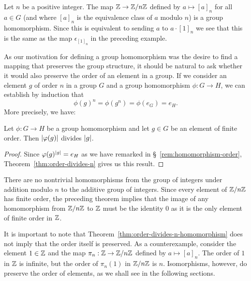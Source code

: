 \begin{example}
    Let \(n\) be a positive integer. The map \(\mathbb{Z} \to \mathbb{Z}/n\mathbb{Z}\) defined by \(a
    \mapsto [a]_n\) for all \(a \in G\) (and where \([a]_n\) is the equivalence
    class of \(a\) modulo \(n\)) is a group homomorphism. Since this is
    equivalent to sending \(a\) to \(a \cdot [1]_n\) we see that this is the
    same as the map \(\epsilon_{[1]_n}\) in the preceding example.
\end{example}

\begin{remark}
    \label{rem:homomorphism-order}
    As our motivation for defining a group homomorphism was the desire to find a
    mapping that preserves the group structure, it should be natural to ask
    whether it would also preserve the order of an element in a group. If we
    consider an element \(g\) of order \(n\) in a group \(G\) and a group
    homomorphism \(\phi: G \to H\), we can establish by induction that
    \[
        \phi(g)^n = \phi(g^n) = \phi(e_G) = e_H.
    \]
    More precisely, we have:
\end{remark}

\begin{theorem}
    \label{thm:order-divides-n-homomorphism}
    Let \(\phi: G \to H\) be a group homomorphism and let \(g \in G\) be an
    element of finite order. Then \(\lvert \varphi(g) \rvert\) divides \(\lvert g \rvert\).
\end{theorem}

\begin{proof}
    Since \(\varphi(g)^{\lvert g \rvert} = e_H\) as we have remarked in
    \S~\ref{rem:homomorphism-order}, Theorem~\ref{thm:order-divides-n} gives us
    this result.
\end{proof}

\begin{example}
    There are no nontrivial homomorphisms from the group of integers under
    addition modulo \(n\) to the additive group of integers. Since every element
    of \(\mathbb{Z}/n\mathbb{Z}\) has finite order, the preceding theorem implies that the image
    of any homomorphism from \(\mathbb{Z}/n\mathbb{Z}\) to \(\mathbb{Z}\) must be the identity \(0\) as
    it is the only element of finite order in \(\mathbb{Z}\).
\end{example}

\begin{example}
    It is important to note that Theorem~\ref{thm:order-divides-n-homomorphism}
    does not imply that the order itself is preserved. As a counterexample,
    consider the element \(1 \in \mathbb{Z}\) and the map \(\pi_n : \mathbb{Z} \to \mathbb{Z}/n\mathbb{Z}\)
    defined by \(a \mapsto [a]_n\). The order of \(1\) in \(\mathbb{Z}\) is infinite,
    but the order of \(\pi_n(1)\) in \(\mathbb{Z}/n\mathbb{Z}\) is \(n\). Isomorphisms, however,
    do preserve the order of elements, as we shall see in the following
    sections.
\end{example}

